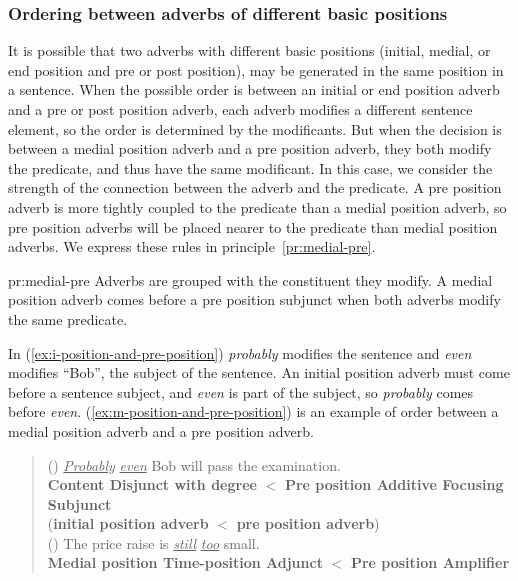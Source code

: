 \subsubsection{Ordering between adverbs of different basic positions}

It is possible that two adverbs with different basic positions
(initial, medial, or end position and pre or post position), may be
generated in the same position in a sentence.  When the possible order
is between an initial or end position adverb and a pre or post
position adverb, each adverb modifies a different sentence element, so
the order is determined by the modificants.
But when the decision is between a medial position adverb and a pre position
adverb, they both modify the predicate, and thus have the same
modificant.  In this case, we consider the strength of the connection
between the adverb and the predicate.  A pre position adverb is more
tightly coupled to the predicate than a medial position adverb, so pre
position adverbs will be placed nearer to the predicate than medial
position adverbs.  We express these rules in
principle~\ref{pr:medial-pre}.

\begin{pr}{pr:medial-pre}{}
  Adverbs are grouped with the constituent they modify.  A medial
  position adverb comes before a pre position subjunct when both
  adverbs modify the same predicate.
\end{pr}

In (\ref{ex:i-position-and-pre-position}) {\em probably} modifies the
sentence and {\em even} modifies ``Bob'', the subject of the sentence.
An initial position adverb must come before a sentence subject, and
{\em even} is part of the subject, so {\em probably} comes before  {\em
  even}. (\ref{ex:m-position-and-pre-position}) is an example of
order between a medial position adverb and a pre position adverb.

\begin{singlespace}
\begin{quote}
 \small
 () 
\underline{\em Probably} \underline{\em even} Bob will pass the examination. \\
 {\bf Content Disjunct with degree} $<$ 
              {\bf Pre position Additive Focusing Subjunct}\\
 ({\bf initial position adverb} $<$ {\bf pre position adverb})\\
              ()
  The price raise is \underline{\em still} \underline{\em too} small. \\
 {\bf Medial position Time-position Adjunct} $<$ 
              {\bf Pre position Amplifier}
  
 \vspace*{-3mm}
\end{quote}
\end{singlespace}

